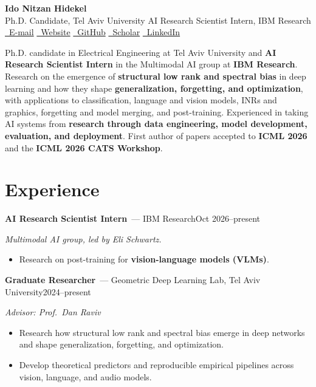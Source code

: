 \documentclass[10pt]{article}
\newcommand{\entry}[3]{\textbf{#1}{\color{muted}\ --- #2}\hfill{\color{muted}\small #3}\par}
\newcommand{\sub}[1]{{\color{muted}\small\itshape #1}\par}
\begin{document}
\begin{center}
  {\fontsize{25}{30}\selectfont\bfseries\color{primary} Ido Nitzan Hidekel}\\[3pt]
  {\small\color{muted} Ph.D. Candidate, Tel Aviv University \enspace\textbullet\enspace AI Research Scientist Intern, IBM Research}\\[4pt]
  {\small
    \href{mailto:idonithid@gmail.com}{\faEnvelope\ E-mail}\qquad
    \href{https://idonithid.github.io}{\faGlobe\ Website}\qquad
    \href{https://github.com/idonithid}{\faGithub\ GitHub}\qquad
    \href{https://scholar.google.com/citations?user=CQ8pQSUAAAAJ}{\faGraduationCap\ Scholar}\qquad
    \href{https://www.linkedin.com/in/ido-nitzan-hidekel-5b3254160}{\faLinkedin\ LinkedIn}}
\end{center}
\vspace{-11pt}{\color{primary}\rule{\linewidth}{0.6pt}}\par\vspace{2pt}

Ph.D. candidate in Electrical Engineering at Tel Aviv University and \textbf{AI Research Scientist Intern} in the
Multimodal AI group at \textbf{IBM Research}. Research on the emergence of \textbf{structural low rank and spectral bias}
in deep learning and how they shape \textbf{generalization, forgetting, and optimization}, with applications to
classification, language and vision models, INRs and graphics, forgetting and model merging, and post-training.
Experienced in taking AI systems from \textbf{research through data engineering, model development, evaluation, and
deployment}. First author of papers accepted to \textbf{ICML 2026} and the \textbf{ICML 2026 CATS Workshop}.

\section{Experience}
\entry{AI Research Scientist Intern}{IBM Research}{Oct 2026--present}
\sub{Multimodal AI group, led by Eli Schwartz.}
\begin{itemize}
  \item Research on post-training for \textbf{vision-language models (VLMs)}.
\end{itemize}
\vspace{2pt}

\entry{Graduate Researcher}{Geometric Deep Learning Lab, Tel Aviv University}{2024--present}
\sub{Advisor: Prof.\ Dan Raviv}
\begin{itemize}
  \item Research how structural low rank and spectral bias emerge in deep networks and shape generalization,
        forgetting, and optimization.
  \item Develop theoretical predictors and reproducible empirical pipelines across vision, language, and audio models.
\end{itemize}
\vspace{2pt}
\end{document}
